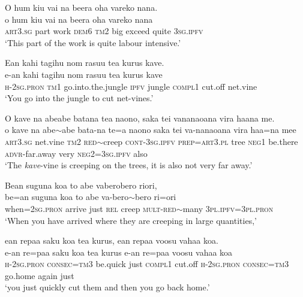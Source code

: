 \ea\label{ex:text22-36}
O hum kiu vai na beera oha vareko nana.\\
\gll o	hum	kiu	vai	na	beera	oha	vareko	nana\\
     \textsc{art}3.\textsc{sg}	part	work	\textsc{dem}6	\textsc{tm}2	big	exceed	quite	3\textsc{sg}.\textsc{ipfv}\\
\glt `This part of the work is quite labour intensive.'
\z

\ea\label{ex:text22-37}
Ean kahi tagihu nom rasuu tea kurus kave.\\
\gll e-an	kahi	tagihu	nom	rasuu	tea	kurus	kave\\
     \textsc{h}-2\textsc{sg}.\textsc{pron}	\textsc{tm}1	go.into.the.jungle	\textsc{ipfv}	jungle	\textsc{compl}1	cut.off	net.vine\\
\glt `You go into the jungle to cut net-vines.'
\z

\ea\label{ex:text22-38}
O kave na abeabe batana tea naono, saka tei vananaoana vira haana me.\\
\gll o	kave	na	abe{$\sim$}abe	bata-na	te=a	naono	saka	tei	va-nanaoana	vira	haa=na	mee\\
     \textsc{art}3.\textsc{sg}	net.vine	\textsc{tm}2	\textsc{red}{$\sim$}creep	\textsc{cont}-3\textsc{sg}.\textsc{ipfv}	\textsc{prep}=\textsc{art}3.\textsc{pl}	tree	\textsc{neg}1	be.there	\textsc{advr}-far.away	very	\textsc{neg}2=3\textsc{sg}.\textsc{ipfv}	also\\
\glt `The \textit{kave}-vine is creeping on the trees, it is also not very far away.'
\z

\ea\label{ex:text22-39}
Bean suguna koa to abe vaberobero riori,\\
\gll be=an	suguna	koa	to	abe	va-bero{$\sim$}bero	ri=ori\\
     when=2\textsc{sg}.\textsc{pron}	arrive	just	\textsc{rel}	creep	\textsc{mult}-\textsc{red}{$\sim$}many	3\textsc{pl}.\textsc{ipfv}=3\textsc{pl}.\textsc{pron}\\
\glt `When you have arrived where they are creeping in large quantities,'
\z

\ea\label{ex:text22-40}
ean repaa saku koa tea kurus, ean repaa voosu vahaa koa.\\
\gll e-an	re=paa	saku	koa	tea	kurus	e-an	re=paa	voosu	vahaa	koa\\
     \textsc{h}-2\textsc{sg}.\textsc{pron}	\textsc{consec}=\textsc{tm}3	be.quick	just	\textsc{compl}1	cut.off	\textsc{h}-2\textsc{sg}.\textsc{pron}	\textsc{consec}=\textsc{tm}3	go.home	again	just\\
\glt `you just quickly cut them and then you go back home.'
\z

